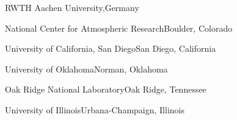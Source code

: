 \begin{multicols}{2}
{RWTH Aachen University,}{Germany}

 {National Center for Atmospheric
Research}{Boulder, Colorado}

 {University of California, San Diego}{San
Diego, California}

 {University of Oklahoma}{Norman, Oklahoma}

 {Oak Ridge National Laboratory}{Oak
Ridge, Tennessee}

 {University of Illinois}{Urbana-Champaign,
Illinois}

\end{multicols}